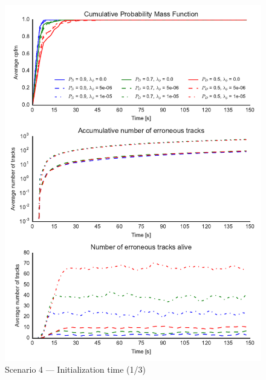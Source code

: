 \begin{figure}
\centering
\includegraphics{Figures/plots/Scenario4_Init-Time(1-3).pdf}
\caption{Scenario 4 --- Initialization time (1/3)}\label{fig:init4_time_1-3}
\end{figure}

